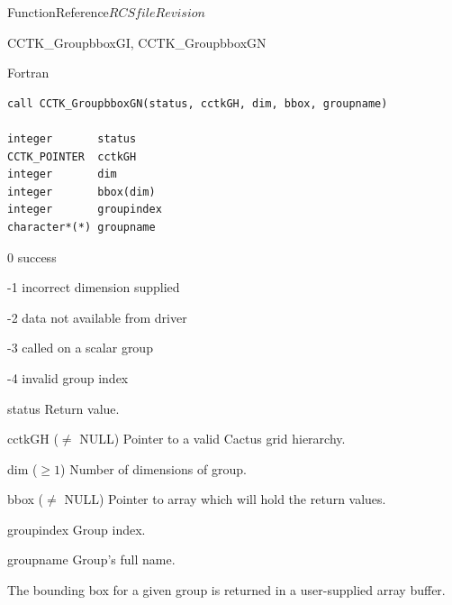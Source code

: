 \begin{cactuspart}{FunctionReference}{$RCSfile$}{$Revision$}
\begin{FunctionDescription}{CCTK\_GroupbboxGI, CCTK\_GroupbboxGN}
\begin{SynopsisSection}
\begin{Synopsis}{Fortran}
\begin{verbatim}
call CCTK_GroupbboxGN(status, cctkGH, dim, bbox, groupname)

integer       status
CCTK_POINTER  cctkGH
integer       dim
integer       bbox(dim)
integer       groupindex
character*(*) groupname
\end{verbatim}
\end{Synopsis}
\end{SynopsisSection}

\begin{ResultSection}
\begin{Result}{\rm 0} success \end{Result}
\begin{Result}{\rm -1} incorrect dimension supplied \end{Result}
\begin{Result}{\rm -2} data not available from driver \end{Result}
\begin{Result}{\rm -3} called on a scalar group \end{Result}
\begin{Result}{\rm -4} invalid group index \end{Result}
\end{ResultSection}

\begin{ParameterSection}
\begin{Parameter}{status} Return value. \end{Parameter}
\begin{Parameter}{cctkGH ($\ne$ NULL)} Pointer to a valid Cactus grid hierarchy. \end{Parameter}
\begin{Parameter}{dim ($\ge 1$)} Number of dimensions of group. \end{Parameter}
\begin{Parameter}{bbox ($\ne$ NULL)} Pointer to array which will hold the return values. \end{Parameter}
\begin{Parameter}{groupindex} Group index. \end{Parameter}
\begin{Parameter}{groupname} Group's full name. \end{Parameter}
\end{ParameterSection}

\begin{Discussion}
The bounding box for a given group is returned in a user-supplied array buffer.
\end{Discussion}


\end{FunctionDescription}
\end{cactuspart}
